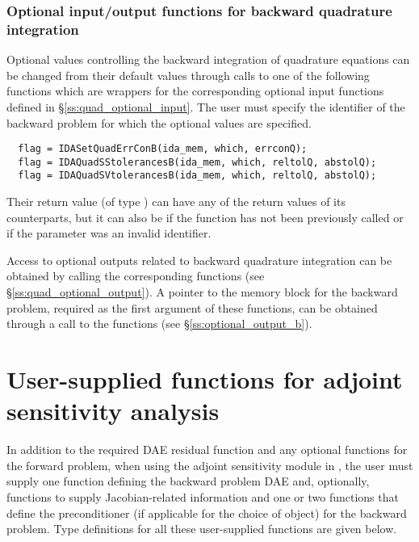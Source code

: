 \subsubsection{Optional input/output functions for backward quadrature integration}
\label{sss:quad_optional_input_B}
Optional values controlling the backward integration of quadrature equations can be
changed from their default values through calls to one of the following functions
which are wrappers for the corresponding optional input functions defined in
\S\ref{ss:quad_optional_input}. The user must specify  the identifier 
of the backward problem for which the optional values are specified.

\begin{verbatim}
  flag = IDASetQuadErrConB(ida_mem, which, errconQ);
  flag = IDAQuadSStolerancesB(ida_mem, which, reltolQ, abstolQ);
  flag = IDAQuadSVtolerancesB(ida_mem, which, reltolQ, abstolQ);
\end{verbatim}
Their return value  (of type ) can have any of the return values
of its counterparts, but it can also be  if the function
 has not been previously called or  if the
parameter  was an invalid identifier.

Access to optional outputs related to backward quadrature integration
can be obtained by calling the corresponding 
functions (see \S\ref{ss:quad_optional_output}).  A pointer
 to the {\idas} memory block for the backward problem,
required as the first argument of these functions, can be obtained
through a call to the functions  (see
\S\ref{ss:optional_output_b}).



\section{User-supplied functions for adjoint sensitivity analysis}
\label{ss:user_fct_adj}

In addition to the required DAE residual function and any optional functions
for the forward problem, when using the adjoint sensitivity module in {\idas},
the user must supply one function defining the backward problem DAE and, optionally,
functions to supply Jacobian-related information and one or two functions
that define the preconditioner (if applicable for the choice of
{\sunlinsol} object) for the backward problem.
Type definitions for all these user-supplied functions are given below.

